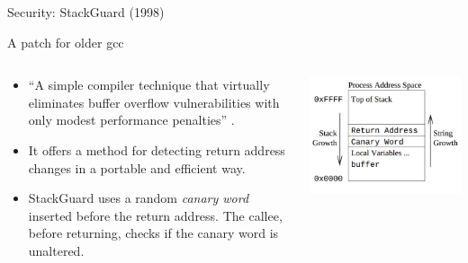 \begin{frame}{Security: StackGuard (1998)}
	\begin{block}{A patch for older gcc}
		\begin{columns}
			\begin{column}{.6\textwidth}
				\begin{itemize}
					\item ``A simple compiler technique that virtually eliminates buffer
						overflow vulnerabilities with only modest performance penalties''
						\cite{stackguard}.
					\item It offers a method for detecting return address changes in a
						portable and efficient way.
					\item StackGuard uses a random \emph{canary word} inserted before
						the return address. The callee, before returning, checks if the canary
						word is unaltered.
				\end{itemize}
			\end{column}
			\begin{column}{.4\textwidth}
				\includegraphics[width=\textwidth]{imgs/sec-canary.png}
			\end{column}
		\end{columns}
	\end{block}
\end{frame}

